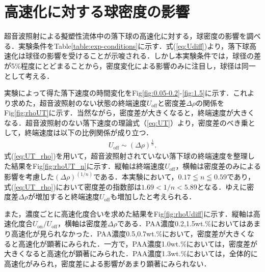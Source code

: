 \section{高速化に対する球密度の影響}
\label{sec:density}
超音波照射による擬塑性流体中の落下球の高速化に対する，球密度の影響を調べる．実験条件をTable\ref{table:exp-conditions}に示す．式(\ref{eq:Udiff})より，落下球高速化は球径の影響を受けることが示唆される．しかし本実験条件では，球径の差が5\%程度にとどまることから，密度変化による影響のみに注目し，球径は同一として考える．

実験によって得た落下速度の時間変化をFig\ref{fig:0.05-0.2}-\ref{fig:1.5}に示す．これより求めた，超音波照射のない状態の終端速度$U_\text{off}$と密度差$\Delta\rho$の関係をFig\ref{fig:rhoUT}に示す．当然ながら，密度差が大きくなると，終端速度が大きくなる．超音波照射のない落下速度の理論式（\ref{eq:UT}）より，密度差のべき乗として，終端速度は以下の比例関係が成り立つ．
\begin{eqnarray}
    U_\text{off}\sim \left(\Delta\rho\right)^{\frac{1}{n}} .
    \label{eq:UT_rho}
\end{eqnarray}
式(\ref{eq:UT_rho})を用いて，超音波照射されていない落下球の終端速度を整理した結果をFig\ref{fig:rhoUT_n}に示す．縦軸は終端速度$U_\text{off}$，横軸は密度差のみによる影響を考慮した$\left(\Delta\rho\right)^{\left(1/n\right)}$である．本実験において，$0.17\leqq n\leqq0.59$であり，式(\ref{eq:UT_rho})において密度差の指数部は$1.69<1/n<5.89$となる．ゆえに密度差$\Delta\rho$が増加すると終端速度$U_\text{off}$も増加したと考えられる．

また，濃度ごとに高速化度合いを求めた結果をFig\ref{fig:rhoUdiff}に示す．縦軸は高速化度合$U_\text{on}/U_\text{off}$，横軸は密度差$\Delta\rho$である．PAA濃度0.2,1.5wt.\%においてはあまり高速化が見られなかった．PAA濃度0.5,0.7wt.\%において，密度差が大きくなると高速化が顕著にみられた．一方で，PAA濃度1.0wt.\%においては，密度差が大きくなると高速化が顕著にみられた．PAA濃度1.3wt.\%においては，全体的に高速化がみられ，密度差による影響があまり顕著にみられない．

